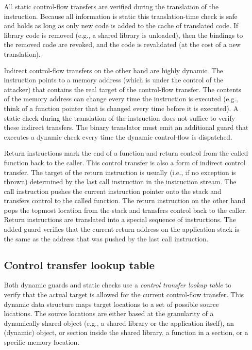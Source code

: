 \documentclass{acm_proc_article-sp}
\begin{document}
All static control-flow transfers are verified during the translation of the
instruction. Because all information is static this translation-time check is
safe and holds as long as only new code is added to the cache of translated
code. If library code is removed (e.g., a shared library is unloaded), then the
bindings to the removed code are revoked, and the code is revalidated (at the
cost of a new translation).


Indirect control-flow transfers on the other hand are highly dynamic. The
instruction points to a memory address (which is under the control of the
attacker) that contains the real target of the control-flow transfer. The
contents of the memory address can change every time the instruction is executed
(e.g., think of a function pointer that is changed every time before it is
executed). A static check during the translation of the instruction does not
suffice to verify these indirect transfers. The binary translator must emit
an additional guard that executes a dynamic check every time the dynamic
control-flow is dispatched. 

Return instructions mark the end of a function and return control from the
called function back to the caller. This control transfer is also a form of
indirect control transfer. The target of the return instruction is usually
(i.e., if no exception is thrown) determined by the last call instruction in the
instruction stream. The call instruction pushes the current instruction pointer
onto the stack and transfers control to the called function. The return
instruction on the other hand pops the topmost location from the stack and
transfers control back to the caller.  Return instructions are translated into a
special sequence of instructions. The added guard verifies that the current
return address on the application stack is the same as the address that was
pushed by the last call instruction.


\subsection{Control transfer lookup table}\label{ctlt}


Both dynamic guards and static checks use a \textit{control transfer lookup
table} to verify that the actual target is allowed for the current control-flow
transfer. This dynamic data structure maps target locations to a set of possible
source locations. The source locations are either based at the granularity of a
dynamically shared object (e.g., a shared library or the application itself), an
(dynamic) object, or section inside the shared library, a function in a section,
or a specific memory location.
\end{document}
